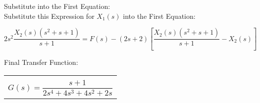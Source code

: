 \documentclass[11pt,letterpaper]{article}
\begin{document}
Substitute into the First Equation:\\[12pt]
Substitute this Expression for $X_1(s)$ into the First Equation:\\
\begin{center}
	$2s^2\dfrac{X_2(s)(s^2+s+1)}{s+1}=F(s)-(2s+2)\left[\dfrac{X_2(s)(s^2+s+1)}{s+1}-X_2(s)\right] $\\[12pt]
\end{center}
Final Transfer Function:\\
\begin{center}
	\begin{tabular}{|c|}
		\hline \\
		$G(s)=\dfrac{s+1}{2s^4+4s^3+4s^2+2s}$	\\ [12pt]
	\hline
	\end{tabular}	
\end{center}

\clearpage
\end{document}
